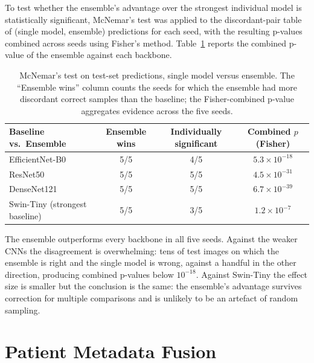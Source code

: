 To test whether the ensemble's advantage over the strongest individual model is statistically significant, McNemar's test was applied to the discordant-pair table of (single model, ensemble) predictions for each seed, with the resulting p-values combined across seeds using Fisher's method. Table~\ref{tab:mcnemar} reports the combined p-value of the ensemble against each backbone.

\begin{table}[H]
\centering
\caption{McNemar's test on test-set predictions, single model versus ensemble. The ``Ensemble wins'' column counts the seeds for which the ensemble had more discordant correct samples than the baseline; the Fisher-combined p-value aggregates evidence across the five seeds.}
\label{tab:mcnemar}
\begin{tabular}{lccc}
\toprule
\textbf{Baseline vs.\ Ensemble} & \textbf{Ensemble wins} & \textbf{Individually significant} & \textbf{Combined $p$ (Fisher)} \\
\midrule
EfficientNet-B0 & 5/5 & 4/5 & $5.3 \times 10^{-18}$ \\
ResNet50        & 5/5 & 5/5 & $4.5 \times 10^{-31}$ \\
DenseNet121     & 5/5 & 5/5 & $6.7 \times 10^{-39}$ \\
Swin-Tiny (strongest baseline) & 5/5 & 3/5 & $1.2 \times 10^{-7}$ \\
\bottomrule
\end{tabular}
\end{table}

The ensemble outperforms every backbone in all five seeds. Against the weaker CNNs the disagreement is overwhelming: tens of test images on which the ensemble is right and the single model is wrong, against a handful in the other direction, producing combined p-values below $10^{-18}$. Against Swin-Tiny the effect size is smaller but the conclusion is the same: the ensemble's advantage survives correction for multiple comparisons and is unlikely to be an artefact of random sampling.

\section{Patient Metadata Fusion}

